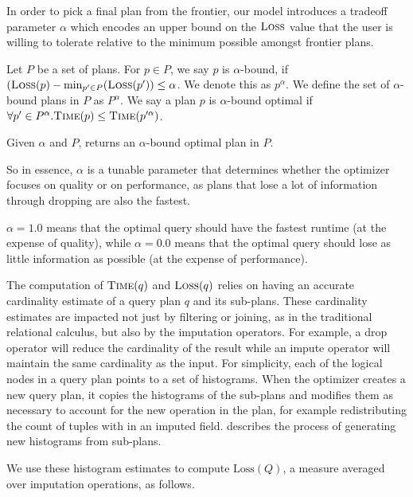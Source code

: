 In order to pick a final plan from the frontier, our model introduces a tradeoff parameter $\alpha$ which encodes an upper bound on the $\textsc{Loss}$ value that the user is willing
to tolerate relative to the minimum possible amongst frontier plans.

\begin{definition}
Let $P$ be a set of plans. For $p \in P$, we say $p$ is $\alpha$-bound, if $(\textsc{Loss}(p) - \min_{p' \in P}(\textsc{Loss}(p')) \leq \alpha$. We denote this as $p^\alpha$.
We define the set of $\alpha$-bound plans in $P$ as $P^\alpha$.
We say a plan $p$ is $\alpha$-bound optimal if $\forall p' \in P^\alpha. \textsc{Time}(p) \leq \textsc{Time}(p'^\alpha)$. 
\end{definition}

Given $\alpha$ and $P$, \ProjectName{} returns an $\alpha$-bound optimal plan in $P$.

So in essence, $\alpha$ is a tunable parameter that determines whether the optimizer focuses on quality or on performance, as plans that
lose a lot of information through dropping are also the fastest. 

$\alpha = 1.0$ means that the optimal query should have the fastest runtime (at the expense of quality), while $\alpha=0.0$ means that the optimal query should lose
as little information as possible (at the expense of performance).

The computation of $\textsc{Time}(q)$ and $\textsc{Loss}(q)$ relies on having an accurate cardinality estimate of a query plan $q$ and its sub-plans. 
These cardinality estimates are impacted not just by filtering or joining, as in the traditional relational calculus, but also by the imputation operators.
For example, a drop operator will reduce the cardinality of the result while an impute operator will maintain the same cardinality as the input.
For simplicity, each of the logical nodes in a query plan points to a set of histograms.
When the optimizer creates a new query plan, it copies the histograms of the sub-plans and modifies them as necessary to account for the new operation in the plan, for example
redistributing the count of tuples with \nullv{} in an imputed field.
 describes the process of generating new histograms from sub-plans.

We use these histogram estimates to compute $\text{Loss}(Q)$, a measure averaged over imputation operations, as follows.

